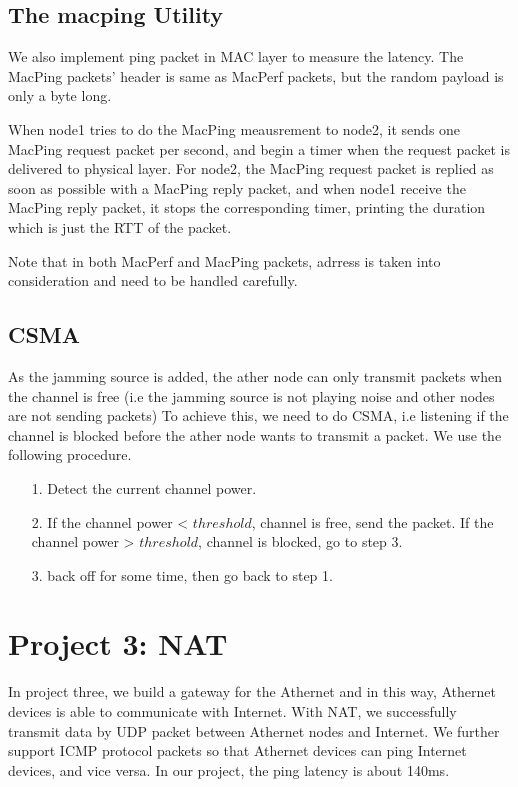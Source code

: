 \documentclass[11pt, conference]{IEEEtran}
\begin{document}
\subsection{The \textsf{macping} Utility}

We also implement ping packet in MAC layer to measure the latency. The MacPing packets' header is same as MacPerf packets, but the random payload is only a byte long.

When node1 tries to do the MacPing meausrement to node2, it sends one MacPing request packet per second, and begin a timer when the request packet is delivered to physical layer. For node2, the MacPing request packet is replied
as soon as possible with a MacPing reply packet, and when node1 receive the MacPing reply packet, it stops the corresponding timer, printing the duration which is just the RTT of the packet.

Note that in both MacPerf and MacPing packets, adrress is taken into consideration and need to be handled carefully.

\subsection{{CSMA}}
As the jamming source is added, the ather node can only transmit packets when the channel is free (i.e the jamming source is not playing noise and other nodes are not sending packets)
To achieve this, we need to do CSMA, i.e listening if the channel is blocked before the ather node wants to transmit a packet. We use the following procedure.
\begin{itemize}
    \item[1.] Detect the current channel power.
    \item[2.] If the channel power < $threshold$, channel is free, send the packet. If the channel power > $threshold$, channel is blocked, go to step 3. 
    \item[3.] back off for some time, then go back to step 1.
\end{itemize}

\section{Project 3: NAT}

In project three, we build a gateway for the Athernet and in this way, Athernet devices is able to communicate with Internet. With NAT, we successfully transmit data by UDP packet between Athernet nodes and Internet. 
We further support ICMP protocol packets so that Athernet devices can ping Internet devices, and vice versa. In our project, the ping latency is about 140ms.
\end{document}
